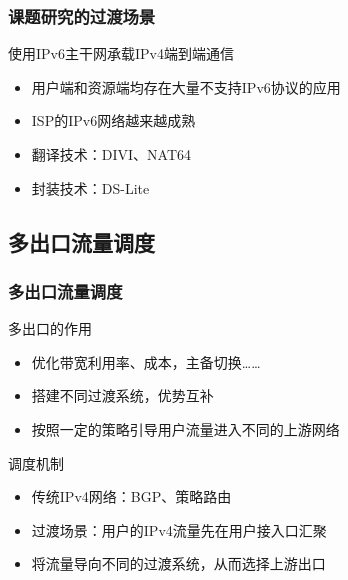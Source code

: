 \documentclass{beamer}
\begin{document}
\begin{frame}
  \frametitle{课题研究的过渡场景}

  \begin{block}{使用IPv6主干网承载IPv4端到端通信}
    \begin{itemize}
    \item 用户端和资源端均存在大量不支持IPv6协议的应用
    \item ISP的IPv6网络越来越成熟
    \item 翻译技术：DIVI、NAT64
    \item 封装技术：DS-Lite
    \end{itemize}
  \end{block}
\end{frame}

\subsection{多出口流量调度}
\begin{frame}
  \frametitle{多出口流量调度}

  \begin{block}{多出口的作用}
    \begin{itemize}
    \item 优化带宽利用率、成本，主备切换……
    \item 搭建不同过渡系统，优势互补
    \item 按照一定的策略引导用户流量进入不同的上游网络
    \end{itemize}
  \end{block}

  \begin{block}{调度机制}
    \begin{itemize}
    \item 传统IPv4网络：BGP、策略路由
    \item 过渡场景：用户的IPv4流量先在用户接入口汇聚
    \item 将流量导向不同的过渡系统，从而选择上游出口
    \end{itemize}
  \end{block}
\end{frame}
\end{document}
